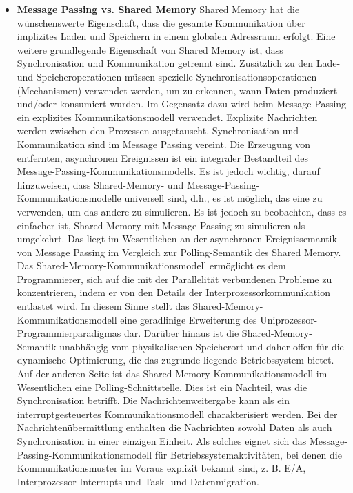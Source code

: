 \documentclass[a4paper]{article}
\begin{document}
\begin{itemize}
    \item \textbf{Message Passing vs. Shared Memory} Shared Memory hat die wünschenswerte Eigenschaft, dass die gesamte Kommunikation über implizites Laden und Speichern in einem globalen Adressraum erfolgt.
          Eine weitere grundlegende Eigenschaft von Shared Memory ist, dass Synchronisation und Kommunikation getrennt sind. Zusätzlich zu den Lade- und Speicheroperationen müssen spezielle Synchronisationsoperationen (Mechanismen) verwendet werden, um zu erkennen, wann Daten produziert und/oder konsumiert wurden.
          Im Gegensatz dazu wird beim Message Passing ein explizites Kommunikationsmodell verwendet. Explizite Nachrichten werden zwischen den Prozessen ausgetauscht.
          Synchronisation und Kommunikation sind im Message Passing vereint. Die Erzeugung von entfernten, asynchronen Ereignissen ist ein integraler Bestandteil des Message-Passing-Kommunikationsmodells.
          Es ist jedoch wichtig, darauf hinzuweisen, dass Shared-Memory- und Message-Passing-Kommunikationsmodelle universell sind, d.h., es ist möglich, das eine zu verwenden, um das andere zu simulieren.
          Es ist jedoch zu beobachten, dass es einfacher ist, Shared Memory mit Message Passing zu simulieren als umgekehrt.
          Das liegt im Wesentlichen an der asynchronen Ereignissemantik von Message Passing im Vergleich zur Polling-Semantik des Shared Memory.
          Das Shared-Memory-Kommunikationsmodell ermöglicht es dem Programmierer, sich auf die mit der Parallelität verbundenen Probleme zu konzentrieren, indem er von den Details der Interprozessorkommunikation entlastet wird.
          In diesem Sinne stellt das Shared-Memory-Kommunikationsmodell eine geradlinige Erweiterung des Uniprozessor-Programmierparadigmas dar. Darüber hinaus ist die Shared-Memory-Semantik unabhängig vom physikalischen Speicherort und daher offen für die dynamische Optimierung, die das zugrunde liegende Betriebssystem bietet.
          Auf der anderen Seite ist das Shared-Memory-Kommunikationsmodell im Wesentlichen eine Polling-Schnittstelle. Dies ist ein Nachteil, was die Synchronisation betrifft.
          Die Nachrichtenweitergabe kann als ein interruptgesteuertes Kommunikationsmodell charakterisiert werden. Bei der Nachrichtenübermittlung enthalten die Nachrichten sowohl Daten als auch Synchronisation in einer einzigen Einheit. Als solches eignet sich das Message-Passing-Kommunikationsmodell für Betriebssystemaktivitäten, bei denen die Kommunikationsmuster im Voraus explizit bekannt sind, z. B. E/A, Interprozessor-Interrupts und Task- und Datenmigration.

\end{itemize}
\end{document}

